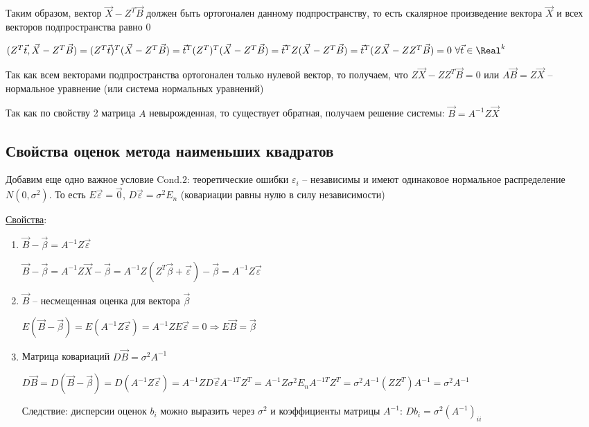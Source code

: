 Таким образом, вектор $\vec X - Z^T \vec B$ должен быть ортогонален данному подпространству, то есть скалярное произведение вектора $\vec X$ и всех векторов подпространства равно 0

$(Z^T \vec t, \vec X - Z^T \vec B) = (Z^T \vec t)^T (\vec X - Z^T \vec B) = {\vec t}^T (Z^T)^T (\vec X - Z^T \vec B) = {\vec t}^T Z (\vec X - Z^T \vec B) = 
{\vec t}^T (Z \vec X - Z Z ^T \vec B) = 0 \ \forall \vec t \in \Real^k$

Так как всем векторами подпространства ортогонален только нулевой вектор, то получаем, что $Z \vec X - Z Z^T \vec B = 0$ или $A \vec B = Z \vec X$ -- нормальное уравнение (или система нормальных уравнений)

Так как по свойству 2 матрица $A$ невырожденная, то существует обратная, получаем решение системы: $\vec B = A^{-1} Z \vec X$

\subsection{Свойства оценок метода наименьших квадратов}

Добавим еще одно важное условие $\mathrm{Cond. 2}$: теоретические ошибки $\varepsilon_i$ -- независимы и имеют одинаковое нормальное распределение $N(0, \sigma^2)$.
То есть $E \vec \varepsilon = \vec 0$, $D \vec \varepsilon = \sigma^2 E_n$ (ковариации равны нулю в силу независимости)

\hypertarget{mls_evaluation_properties}{}

\underline{Свойства}:

\begin{enumerate}
    \item $\vec B - \vec \beta = A^{-1} Z \vec \varepsilon$

    \begin{MyProof}
        $\vec B - \vec \beta = A^{-1} Z \vec X - \vec \beta = A^{-1} Z (Z^T \vec \beta + \vec \varepsilon) - \vec \beta = A^{-1} Z \vec \varepsilon$
    \end{MyProof}

    \item $\vec B$ -- несмещенная оценка для вектора $\vec \beta$

    \begin{MyProof}
        $E(\vec B - \vec \beta) = E(A^{-1} Z \vec \varepsilon) = A^{-1} Z E \vec \varepsilon = 0 \Longrightarrow E \vec B = \vec \beta$
    \end{MyProof}

    \item Матрица ковариаций $D \vec B = \sigma^2 A^{-1}$

    \begin{MyProof}
        $D \vec B = D (\vec B - \vec \beta) = D (A^{-1} Z \vec \varepsilon) = A^{-1} Z D \vec \varepsilon A^{-1 T} Z^T = A^{-1} Z \sigma^2 E_n A^{-1 T} Z^T = \sigma^2 A^{-1} (Z Z^T) A^{-1} = \sigma^2 A^{-1}$
    \end{MyProof}

    Следствие: дисперсии оценок $b_i$ можно выразить через $\sigma^2$ и коэффициенты матрицы $A^{-1}$: $D b_i = \sigma^2 (A^{-1})_{ii}$

\end{enumerate}

